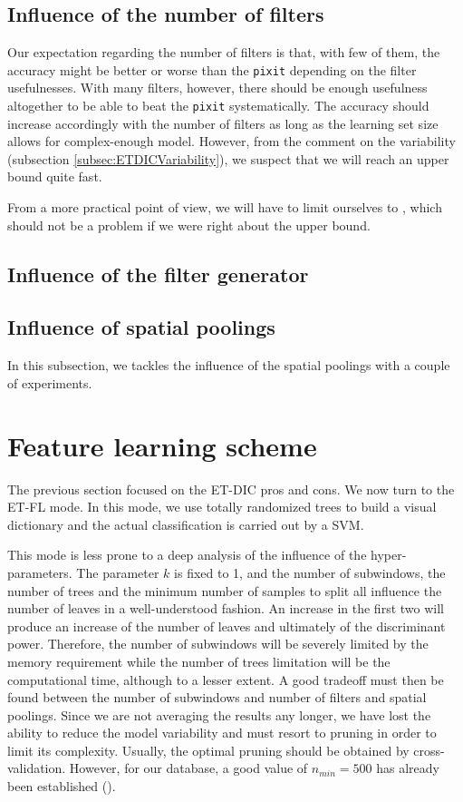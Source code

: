 \documentclass[a4paper]{report}
\begin{document}
	\subsection{Influence of the number of filters}
	Our expectation regarding the number of filters is that, with few of them, the accuracy might be better or worse than the \texttt{pixit} depending on the filter usefulnesses. With many filters, however, there should be enough usefulness altogether to be able to beat the \texttt{pixit} systematically. The accuracy should increase accordingly with the number of filters as long as the learning set size allows for complex-enough model. However, from the comment on the variability (subsection \ref{subsec:ETDICVariability}), we suspect that we will reach an upper bound quite fast. 
	\par
	From a more practical point of view, we will have to limit ourselves to 
	, which should not be a problem if we were right about the upper bound.
		
	\subsection{Influence of the filter generator}
	
	\subsection{Influence of spatial poolings}
	In this subsection, we tackles the influence of the spatial poolings with a couple of experiments.

	\section{Feature learning scheme}
	The previous section focused on the ET-DIC pros and cons. We now turn to the ET-FL mode. In this mode, we use totally randomized trees to build a visual dictionary and the actual classification is carried out by a SVM. 
	\par
	This mode is less prone to a deep analysis of the influence of the hyper-parameters. The parameter $k$ is fixed to 1, and the number of subwindows, the number of trees and the minimum number of samples to split all influence the number of leaves in a well-understood fashion. An increase in the first two will produce an increase of the number of leaves and ultimately of the discriminant power. Therefore, the number of subwindows will be severely limited by the memory requirement while the number of trees limitation will be the computational time, although to a lesser extent. A good tradeoff must then be found between the number of subwindows and number of filters and spatial poolings. 
	Since we are not averaging the results any longer, we have lost the ability to reduce the model variability and must resort to pruning in order to limit its complexity. Usually, the optimal pruning should be obtained by cross-validation. However, for our database, a good value of $n_{min} = 500$ has already been established (\cite{}). 
\end{document}
